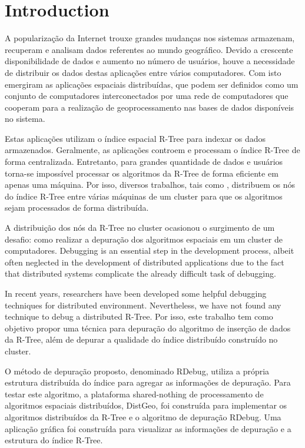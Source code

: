 \section{Introduction}
\label{sec:intro}

A popularização da Internet trouxe grandes mudanças nos sistemas armazenam, recuperam e analisam dados referentes ao mundo
geográfico. Devido a crescente disponibilidade de dados e aumento no número de
usuários, houve a necessidade de distribuir os dados destas aplicações entre vários computadores. 
Com isto emergiram as aplicações espaciais distribuídas, que podem ser definidos como um conjunto de computadores interconectados por uma rede de computadores que cooperam para a realização de geoprocessamento nas bases de dados disponíveis no sistema.

Estas aplicações utilizam o índice espacial R-Tree para indexar os dados armazenados. Geralmente, as aplicações controem e processam o índice R-Tree de forma centralizada. Entretanto, para grandes quantidade de dados e usuários torna-se impossível processar os algoritmos da R-Tree de forma eficiente em apenas uma máquina. Por isso, diversos trabalhos, tais como \cite{an1999storing,dedsi,zhong2012towards}, distribuem os nós do índice R-Tree entre várias máquinas de um cluster para que os algoritmos sejam processados de forma distribuída.

A distribuição dos nós da R-Tree no cluster ocasionou o surgimento de um desafio: como realizar a depuração dos algoritmos espaciais em um cluster de computadores. Debugging is an essential step in the development process, albeit often neglected in the development of distributed applications due to the fact that distributed systems complicate the already difficult task of debugging.

In recent years, researchers have been developed some helpful debugging techniques for distributed environment. Nevertheless, we have not found any technique to debug a distributed R-Tree. Por isso, este trabalho tem como objetivo propor uma técnica para depuração do algoritmo de inserção de dados da R-Tree, além de depurar a qualidade do índice distribuído construído no cluster. 

O método de depuração proposto, denominado RDebug, utiliza a própria estrutura distribuída do índice para agregar as informações de depuração. Para testar este algoritmo, a plataforma shared-nothing de processamento de algoritmos espaciais distribuídos, DistGeo, foi construída para implementar os algoritmos distribuídos da R-Tree e o algoritmo de depuração RDebug. Uma aplicação gráfica foi construída para visualizar as informações de depuração e a estrutura do índice R-Tree. 

